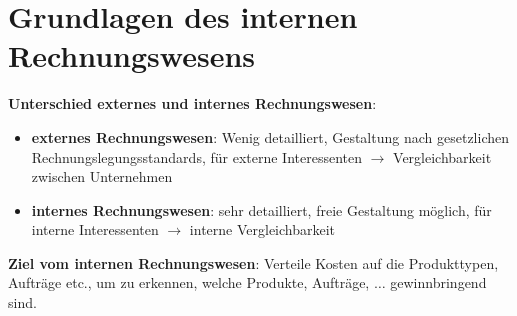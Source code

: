 \section{Grundlagen des internen Rechnungswesens}

\textbf{Unterschied externes und internes Rechnungswesen}:
\begin{itemize}
	\item \textbf{externes Rechnungswesen}: Wenig detailliert, Gestaltung nach gesetzlichen Rechnungslegungsstandards, für externe Interessenten $\rightarrow$ Vergleichbarkeit zwischen Unternehmen
	\item \textbf{internes Rechnungswesen}: sehr detailliert, freie Gestaltung möglich, für interne Interessenten $\rightarrow$ interne Vergleichbarkeit
\end{itemize}

\textbf{Ziel vom internen Rechnungswesen}: Verteile Kosten auf die Produkttypen, Aufträge etc., um zu erkennen, welche Produkte, Aufträge, $\ldots$ gewinnbringend sind.